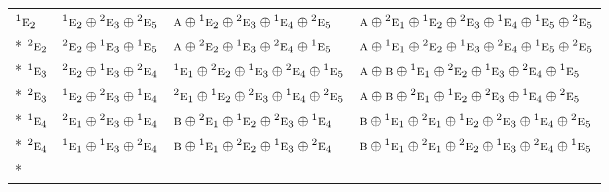 \documentclass[10pt,a4paper]{article}
\numberwithin{equation}{section}
\newcommand{\irr}[1]{\text{\normalfont\scshape #1}}
\newcommand{\conjpair}[1]{{}^{#1}}
\begin{document}
{\begin{longtable}{@{}llll@{}}
$\conjpair{1}\irr{e}_{2}$ & $\conjpair{1}\irr{e}_{2}\oplus \conjpair{2}\irr{e}_{3}\oplus \conjpair{2}\irr{e}_{5}$ & $\irr{a}\oplus \conjpair{1}\irr{e}_{2}\oplus \conjpair{2}\irr{e}_{3}\oplus \conjpair{1}\irr{e}_{4}\oplus \conjpair{2}\irr{e}_{5}$ & $\irr{a}\oplus \conjpair{2}\irr{e}_{1}\oplus \conjpair{1}\irr{e}_{2}\oplus \conjpair{2}\irr{e}_{3}\oplus \conjpair{1}\irr{e}_{4}\oplus \conjpair{1}\irr{e}_{5}\oplus \conjpair{2}\irr{e}_{5}$\\*
$\conjpair{2}\irr{e}_{2}$ & $\conjpair{2}\irr{e}_{2}\oplus \conjpair{1}\irr{e}_{3}\oplus \conjpair{1}\irr{e}_{5}$ & $\irr{a}\oplus \conjpair{2}\irr{e}_{2}\oplus \conjpair{1}\irr{e}_{3}\oplus \conjpair{2}\irr{e}_{4}\oplus \conjpair{1}\irr{e}_{5}$ & $\irr{a}\oplus \conjpair{1}\irr{e}_{1}\oplus \conjpair{2}\irr{e}_{2}\oplus \conjpair{1}\irr{e}_{3}\oplus \conjpair{2}\irr{e}_{4}\oplus \conjpair{1}\irr{e}_{5}\oplus \conjpair{2}\irr{e}_{5}$\\*
$\conjpair{1}\irr{e}_{3}$ & $\conjpair{2}\irr{e}_{2}\oplus \conjpair{1}\irr{e}_{3}\oplus \conjpair{2}\irr{e}_{4}$ & $\conjpair{1}\irr{e}_{1}\oplus \conjpair{2}\irr{e}_{2}\oplus \conjpair{1}\irr{e}_{3}\oplus \conjpair{2}\irr{e}_{4}\oplus \conjpair{1}\irr{e}_{5}$ & $\irr{a}\oplus \irr{b}\oplus \conjpair{1}\irr{e}_{1}\oplus \conjpair{2}\irr{e}_{2}\oplus \conjpair{1}\irr{e}_{3}\oplus \conjpair{2}\irr{e}_{4}\oplus \conjpair{1}\irr{e}_{5}$\\*
$\conjpair{2}\irr{e}_{3}$ & $\conjpair{1}\irr{e}_{2}\oplus \conjpair{2}\irr{e}_{3}\oplus \conjpair{1}\irr{e}_{4}$ & $\conjpair{2}\irr{e}_{1}\oplus \conjpair{1}\irr{e}_{2}\oplus \conjpair{2}\irr{e}_{3}\oplus \conjpair{1}\irr{e}_{4}\oplus \conjpair{2}\irr{e}_{5}$ & $\irr{a}\oplus \irr{b}\oplus \conjpair{2}\irr{e}_{1}\oplus \conjpair{1}\irr{e}_{2}\oplus \conjpair{2}\irr{e}_{3}\oplus \conjpair{1}\irr{e}_{4}\oplus \conjpair{2}\irr{e}_{5}$\\*
$\conjpair{1}\irr{e}_{4}$ & $\conjpair{2}\irr{e}_{1}\oplus \conjpair{2}\irr{e}_{3}\oplus \conjpair{1}\irr{e}_{4}$ & $\irr{b}\oplus \conjpair{2}\irr{e}_{1}\oplus \conjpair{1}\irr{e}_{2}\oplus \conjpair{2}\irr{e}_{3}\oplus \conjpair{1}\irr{e}_{4}$ & $\irr{b}\oplus \conjpair{1}\irr{e}_{1}\oplus \conjpair{2}\irr{e}_{1}\oplus \conjpair{1}\irr{e}_{2}\oplus \conjpair{2}\irr{e}_{3}\oplus \conjpair{1}\irr{e}_{4}\oplus \conjpair{2}\irr{e}_{5}$\\*
$\conjpair{2}\irr{e}_{4}$ & $\conjpair{1}\irr{e}_{1}\oplus \conjpair{1}\irr{e}_{3}\oplus \conjpair{2}\irr{e}_{4}$ & $\irr{b}\oplus \conjpair{1}\irr{e}_{1}\oplus \conjpair{2}\irr{e}_{2}\oplus \conjpair{1}\irr{e}_{3}\oplus \conjpair{2}\irr{e}_{4}$ & $\irr{b}\oplus \conjpair{1}\irr{e}_{1}\oplus \conjpair{2}\irr{e}_{1}\oplus \conjpair{2}\irr{e}_{2}\oplus \conjpair{1}\irr{e}_{3}\oplus \conjpair{2}\irr{e}_{4}\oplus \conjpair{1}\irr{e}_{5}$\\*

\end{longtable}}
\end{document}
